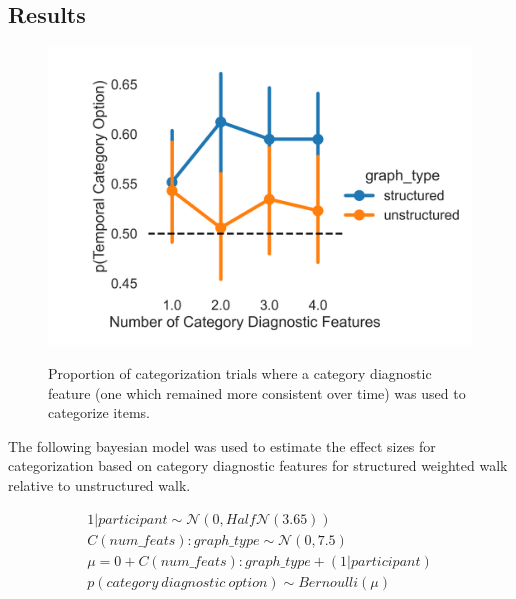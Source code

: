 \subsection{Results}

\begin{figure}[h]
    \centering
    \caption{Proportion of categorization trials where a category diagnostic feature (one which remained more consistent over time) was used to categorize items.}
    \includegraphics[width = \textwidth]{chapter_notebooks/chapter_4/figures/exp4_proportion_results.png}
    \label{fig:exp4a-choice-accuracy}
\end{figure}
The following bayesian model was used to estimate the effect sizes for categorization based on category diagnostic features for structured weighted walk relative to unstructured walk. 

\begin{equation}
    \begin{aligned}
        1|participant \sim \mathcal{N}(0, Half\mathcal{N}(3.65)) \\
        C(num\_feats):graph\_type \sim \mathcal{N}(0, 7.5) \\ 
        \mu = 0  + C(num\_feats):graph\_type + (1|participant) \\
        p(category\ diagnostic\ option) \sim Bernoulli(\mu) 
    \end{aligned}
\end{equation}

